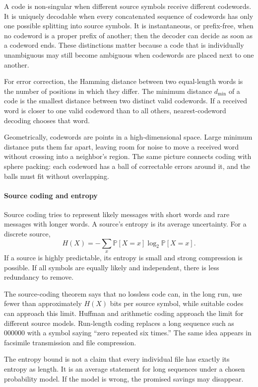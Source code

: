 A code is non-singular when different source symbols receive different codewords. It is uniquely decodable when every concatenated sequence of codewords has only one possible splitting into source symbols. It is instantaneous, or prefix-free, when no codeword is a proper prefix of another; then the decoder can decide as soon as a codeword ends. These distinctions matter because a code that is individually unambiguous may still become ambiguous when codewords are placed next to one another. \cite{coding_theory_ref1,coding_theory_ref5}

For error correction, the Hamming distance between two equal-length words is the number of positions in which they differ. The minimum distance $d_{\min}$ of a code is the smallest distance between two distinct valid codewords. If a received word is closer to one valid codeword than to all others, nearest-codeword decoding chooses that word.

Geometrically, codewords are points in a high-dimensional space. Large minimum distance puts them far apart, leaving room for noise to move a received word without crossing into a neighbor's region. The same picture connects coding with sphere packing: each codeword has a ball of correctable errors around it, and the balls must fit without overlapping.

\paragraph{Source coding and entropy}

Source coding tries to represent likely messages with short words and rare messages with longer words. A source's entropy is its average uncertainty. For a discrete source,
\[
 H(X)=-\sum_x \mathbb P[X=x]\log_2\mathbb P[X=x].
\]
If a source is highly predictable, its entropy is small and strong compression is possible. If all symbols are equally likely and independent, there is less redundancy to remove.

The source-coding theorem says that no lossless code can, in the long run, use fewer than approximately $H(X)$ bits per source symbol, while suitable codes can approach this limit. Huffman and arithmetic coding approach the limit for different source models. Run-length coding replaces a long sequence such as 000000 with a symbol saying “zero repeated six times.” The same idea appears in facsimile transmission and file compression.

The entropy bound is not a claim that every individual file has exactly its entropy as length. It is an average statement for long sequences under a chosen probability model. If the model is wrong, the promised savings may disappear. \cite{coding_theory_ref2,coding_theory_ref6}


